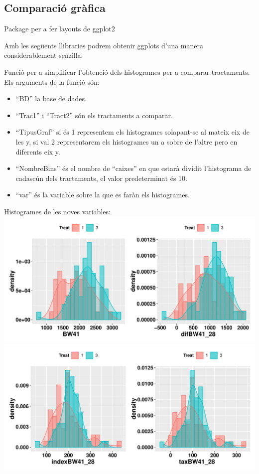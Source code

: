 \documentclass[
  11pt,
]{article}
\begin{document}
\hypertarget{comparaciuxf3-gruxe0fica}{%
\subsection{Comparació gràfica}\label{comparaciuxf3-gruxe0fica}}

Package per a fer layouts de ggplot2

Amb les següents llibraries podrem obtenir ggplots d'una manera
considerablement senzilla.

Funció per a simplificar l'obtenció dels histogrames per a comparar
tractaments. Els arguments de la funció són:

\begin{itemize}
\item
  ``BD'' la base de dades.
\item
  ``Trac1'' i ``Tract2'' són els tractaments a comparar.
\item
  ``TipusGraf'' si és 1 representem els histogrames solapant-se al
  mateix eix de les y, si val 2 representarem els histogrames un a sobre
  de l'altre pero en diferents eix y.
\item
  ``NombreBins'' és el nombre de ``caixes'' en que estarà dividit
  l'histograma de cadascún dels tractaments, el valor predeterminat és
  10.
\item
  ``var'' és la variable sobre la que es faràn els histogrames.
\end{itemize}

Histogrames de les noves variables:
\includegraphics{def_files/figure-latex/unnamed-chunk-10-1.pdf}
\includegraphics{def_files/figure-latex/unnamed-chunk-10-2.pdf}
\end{document}
